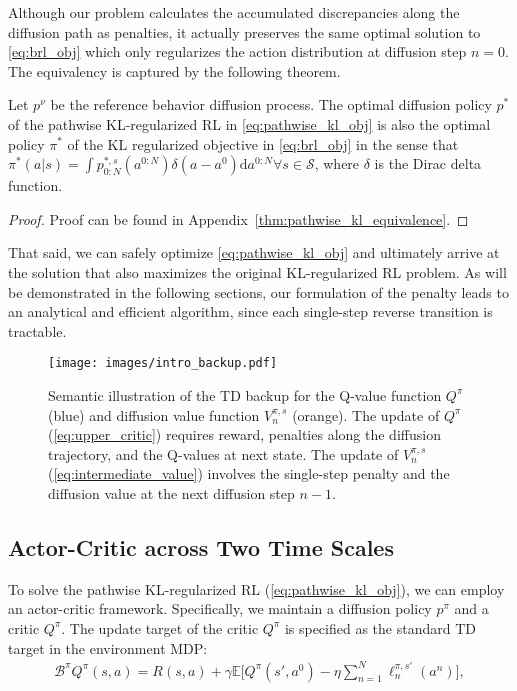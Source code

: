 Although our problem calculates the accumulated discrepancies along the diffusion path as penalties, it actually preserves the same optimal solution to \eqref{eq:brl_obj} which only regularizes the action distribution at diffusion step $n=0$. The equivalency is captured by the following theorem. 
\begin{theorem}
    Let $p^\nu$ be the reference behavior diffusion process. The optimal diffusion policy $p^{*}$ of the pathwise KL-regularized RL in \eqref{eq:pathwise_kl_obj} is also the optimal policy $\pi^*$ of the KL regularized objective in \eqref{eq:brl_obj} in the sense that $\pi^*(a|s)=\int p^{*, s}_{0:N}(a^{0:N})\delta(a-a^0)\mathrm{d}a^{0:N} \forall s\in\mathcal{S}$, where $\delta$ is the Dirac delta function. 
\end{theorem}
\begin{proof}
    Proof can be found in Appendix~\ref{thm:pathwise_kl_equivalence}. 
\end{proof}

That said, we can safely optimize \eqref{eq:pathwise_kl_obj} and ultimately arrive at the solution that also maximizes the original KL-regularized RL problem. As will be demonstrated in the following sections, our formulation of the penalty leads to an analytical and efficient algorithm, since each single-step reverse transition is tractable.

\begin{figure*}
    \centering
    \texttt{[image: images/intro\_backup.pdf]}
    \caption{Semantic illustration of the TD backup for the Q-value function $Q^\pi$ (blue) and diffusion value function $V^{\pi,s}_n$ (orange). The update of $Q^\pi$ (\eqref{eq:upper_critic}) requires reward, penalties along the diffusion trajectory, and the Q-values at next state. The update of $V^{\pi,s}_n$ (\eqref{eq:intermediate_value}) involves the single-step penalty and the diffusion value at the next diffusion step $n-1$. }
    \label{fig:intro_backup}
\end{figure*}

\subsection{Actor-Critic across Two Time Scales}
To solve the pathwise KL-regularized RL (\eqref{eq:pathwise_kl_obj}), we can employ an actor-critic framework. Specifically, we maintain a diffusion policy $p^\pi$ and a critic $Q^\pi$. The update target of the critic $Q^\pi$ is specified as the standard TD target in the environment MDP:
\begin{equation}\label{eq:upper_critic}
\begin{aligned}
    \mathcal{B}^\pi Q^\pi(s,a)=R(s, a)+\gamma \mathbb{E}\Big[Q^\pi(s', a^0)-\eta\sum_{n=1}^N\ell^{\pi,s'}_{n}(a^n)\Big],
\end{aligned}
\end{equation}


